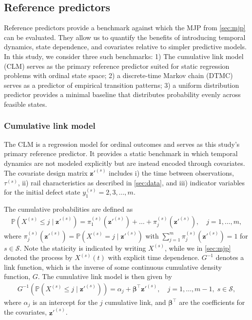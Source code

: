 \documentclass{article}
\begin{document}
\subsection{Reference predictors} \label{sec:reference_forecasts}
Reference predictors provide a benchmark against which the MJP from \cref{sec:mjp} can be evaluated. They allow us to quantify the benefits of introducing temporal dynamics, state dependence, and covariates relative to simpler predictive models.
In this study, we consider three such benchmarks: 1) The cumulative link model (CLM) serves as the primary reference predictor suited for static regression problems with ordinal state space; 
2) a discrete-time Markov chain (DTMC) serves as a predictor of empirical transition patterns; 
3) a uniform distribution predictor provides a minimal baseline that distributes probability evenly across feasible states.

\subsubsection{Cumulative link model} \label{sec:cumulative_link_model}

The CLM is a regression model for ordinal outcomes and serves as this study's primary reference predictor. It provides a static benchmark in which temporal dynamics are not modeled explicitly but are instead encoded through covariates. The covariate design matrix $\bm{z}'^{(s)}$ includes i) the time between observations, $\tau^{(s)}$, ii) rail characteristics as described in \cref{sec:data}, and iii) indicator variables for the initial defect state $y_1^{(s)} =2,3,\dots,m$. 

The cumulative probabilities are defined as
\begin{align*}
     \mathds{P}\left( X^{(s)} \leq j \; \vert \; \bm{z}'^{(s)} \right) = 
     \pi_1^{(s)}(\bm{z}'^{(s)}) + \dots + \pi_j^{(s)}(\bm{z}'^{(s)}), \quad j = 1, \dots, m, 
\end{align*}
where $\pi^{(s)}_j\left(\bm{z}'^{(s)}\right) = \mathds{P} \left(  X^{(s)} = j \; \vert \; \bm{z}'^{(s)} \right)$ with $\sum_{j = 1}^m \pi^{(s)}_j(\bm{z}'^{(s)}) = 1$ for $s \in \mathcal{S}$. 
Note the staticity is indicated by writing $X^{(s)}$, while we in \cref{sec:mjp} denoted the process by $X^{(s)}(t)$ with explicit time dependence.
$G^{-1}$ denotes a link function, which is the inverse of some continuous cumulative density function, $G$.
The cumulative link model is then given by
\begin{align}
    G^{-1} \left(  \mathds{P}\left( X^{(s)} \leq j \; \vert \; \bm{z}'^{(s)} \right) \right)
    = \alpha_j + \bm{\beta}^\top \bm{z}'^{(s)}, \quad j = 1, \dots, m-1, \; s \in \mathcal{S}, \label{eq:cum_link_model}
\end{align}
where $\alpha_j$ is an intercept for the $j$ cumulative link, and $\bm{\beta}^\top$ are the coefficients for the covariates, $\bm{z}'^{(s)}$. 
\end{document}

